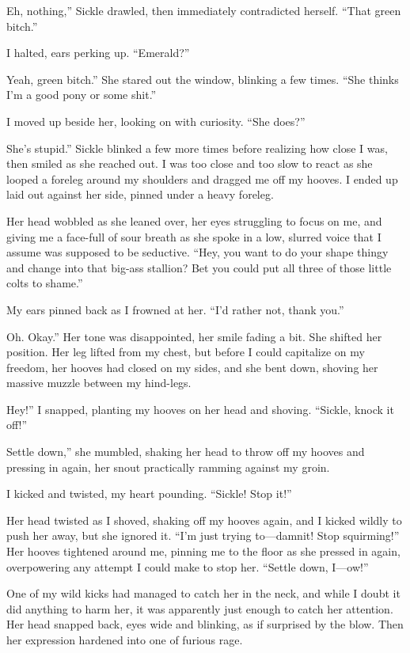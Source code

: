 \leavevmode{}Eh, nothing,” Sickle drawled, then immediately contradicted herself. “That green bitch.”

I halted, ears perking up. “Emerald?”

\leavevmode{}Yeah, green bitch.” She stared out the window, blinking a few times. “She thinks I’m a good pony or some shit.”

I moved up beside her, looking on with curiosity. “She does?”

\leavevmode{}She’s stupid.” Sickle blinked a few more times before realizing how close I was, then smiled as she reached out. I was too close and too slow to react as she looped a foreleg around my shoulders and dragged me off my hooves. I ended up laid out against her side, pinned under a heavy foreleg.

Her head wobbled as she leaned over, her eyes struggling to focus on me, and giving me a face-full of sour breath as she spoke in a low, slurred voice that I assume was supposed to be seductive. “Hey, you want to do your shape thingy and change into that big-ass stallion? Bet you could put all three of those little colts to shame.”

My ears pinned back as I frowned at her. “I’d rather not, thank you.”

\leavevmode{}Oh. Okay.” Her tone was disappointed, her smile fading a bit. She shifted her position. Her leg lifted from my chest, but before I could capitalize on my freedom, her hooves had closed on my sides, and she bent down, shoving her massive muzzle between my hind-legs.

\leavevmode{}Hey!” I snapped, planting my hooves on her head and shoving. “Sickle, knock it off!”

\leavevmode{}Settle down,” she mumbled, shaking her head to throw off my hooves and pressing in again, her snout practically ramming against my groin.

I kicked and twisted, my heart pounding. “Sickle! Stop it!”

Her head twisted as I shoved, shaking off my hooves again, and I kicked wildly to push her away, but she ignored it. “I’m just trying to—damnit! Stop squirming!” Her hooves tightened around me, pinning me to the floor as she pressed in again, overpowering any attempt I could make to stop her. “Settle down, I—ow!”

One of my wild kicks had managed to catch her in the neck, and while I doubt it did anything to harm her, it was apparently just enough to catch her attention. Her head snapped back, eyes wide and blinking, as if surprised by the blow. Then her expression hardened into one of furious rage.

